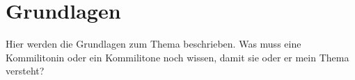 \chapter{Grundlagen}
\label{sec:grundlagen}

Hier werden die Grundlagen zum Thema beschrieben. Was muss eine Kommilitonin oder ein Kommilitone noch wissen, damit sie oder er mein Thema versteht?
